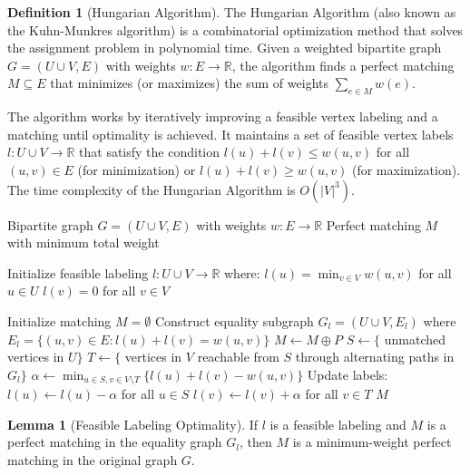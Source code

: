 \documentclass{article}
\theoremstyle{definition}
\newtheorem{lemma}{Lemma}
\newtheorem{definition}{Definition}
\begin{document}
\begin{definition}[Hungarian Algorithm]
The Hungarian Algorithm (also known as the Kuhn-Munkres algorithm) is a combinatorial optimization method that solves the assignment problem in polynomial time. Given a weighted bipartite graph $G = (U \cup V, E)$ with weights $w: E \rightarrow \mathbb{R}$, the algorithm finds a perfect matching $M \subseteq E$ that minimizes (or maximizes) the sum of weights $\sum_{e \in M} w(e)$.

The algorithm works by iteratively improving a feasible vertex labeling and a matching until optimality is achieved. It maintains a set of feasible vertex labels $l: U \cup V \rightarrow \mathbb{R}$ that satisfy the condition $l(u) + l(v) \leq w(u,v)$ for all $(u,v) \in E$ (for minimization) or $l(u) + l(v) \geq w(u,v)$ (for maximization). The time complexity of the Hungarian Algorithm is $O(|V|^3)$.
\end{definition}
\begin{algorithm}
\caption{Hungarian Algorithm (Minimization Version)}
\begin{algorithmic}[1]
\Require Bipartite graph $G = (U \cup V, E)$ with weights $w: E \rightarrow \mathbb{R}$
\Ensure Perfect matching $M$ with minimum total weight

\State Initialize feasible labeling $l: U \cup V \rightarrow \mathbb{R}$ where:
\State $l(u) = \min_{v \in V} w(u,v)$ for all $u \in U$
\State $l(v) = 0$ for all $v \in V$

\State Initialize matching $M = \emptyset$
    \State Construct equality subgraph $G_l = (U \cup V, E_l)$ where $E_l = \{(u,v) \in E : l(u) + l(v) = w(u,v)\}$
        \State $M \gets M \oplus P$ 
    \Else
        \State $S \gets \{$ unmatched vertices in $U\}$
        \State $T \gets \{$ vertices in $V$ reachable from $S$ through alternating paths in $G_l\}$
        \State $\alpha \gets \min_{u \in S, v \in V \setminus T} \{l(u) + l(v) - w(u,v)\}$
        \State Update labels:
        \State $l(u) \gets l(u) - \alpha$ for all $u \in S$
        \State $l(v) \gets l(v) + \alpha$ for all $v \in T$
    \EndIf
\EndWhile
\State \Return $M$
\end{algorithmic}
\end{algorithm}

\pagebreak
\newpage
\clearpage
\begin{lemma}[Feasible Labeling Optimality]
If $l$ is a feasible labeling and $M$ is a perfect matching in the equality graph $G_l$, then $M$ is a minimum-weight perfect matching in the original graph $G$.
\end{lemma}
\end{document}
